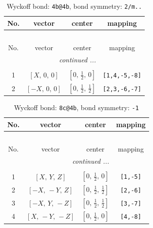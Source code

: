 \documentclass[fleqn,8pt]{jsarticle}
\begin{document}
\renewcommand{\arraystretch}{1.2}
\begin{longtable}{cccc}
\caption{Wyckoff bond: {\tt 4b@4b}, bond symmetry: {\tt 2/m..}}
 \\
 \hline \hline
No. & vector & center & mapping \\ \hline \endfirsthead

\multicolumn{3}{l}{\tablename\ \thetable{}} \\
 \hline \hline
No. & vector & center & mapping \\ \hline \endhead

 \hline \hline
\multicolumn{3}{r}{\footnotesize\it continued ...} \\ \endfoot

 \hline \hline
\multicolumn{3}{r}{} \\ \endlastfoot

1 & $\left[ X,\, 0,\, 0 \right]$ & $\left[ 0,\, \frac{1}{2},\, 0 \right]$ & {\tt [1,4,-5,-8]} \\ \hline
2 & $\left[ - X,\, 0,\, 0 \right]$ & $\left[ 0,\, \frac{1}{2},\, \frac{1}{2} \right]$ & {\tt [2,3,-6,-7]} \\
\end{longtable}
\renewcommand{\arraystretch}{1.2}
\begin{longtable}{cccc}
\caption{Wyckoff bond: {\tt 8c@4b}, bond symmetry: {\tt -1}}
 \\
 \hline \hline
No. & vector & center & mapping \\ \hline \endfirsthead

\multicolumn{3}{l}{\tablename\ \thetable{}} \\
 \hline \hline
No. & vector & center & mapping \\ \hline \endhead

 \hline \hline
\multicolumn{3}{r}{\footnotesize\it continued ...} \\ \endfoot

 \hline \hline
\multicolumn{3}{r}{} \\ \endlastfoot

1 & $\left[ X,\, Y,\, Z \right]$ & $\left[ 0,\, \frac{1}{2},\, 0 \right]$ & {\tt [1,-5]} \\ \hline
2 & $\left[ - X,\, - Y,\, Z \right]$ & $\left[ 0,\, \frac{1}{2},\, \frac{1}{2} \right]$ & {\tt [2,-6]} \\ \hline
3 & $\left[ - X,\, Y,\, - Z \right]$ & $\left[ 0,\, \frac{1}{2},\, \frac{1}{2} \right]$ & {\tt [3,-7]} \\ \hline
4 & $\left[ X,\, - Y,\, - Z \right]$ & $\left[ 0,\, \frac{1}{2},\, 0 \right]$ & {\tt [4,-8]} \\
\end{longtable}
\end{document}
